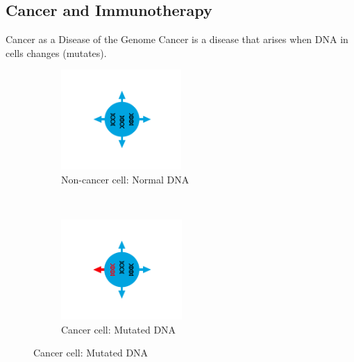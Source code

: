 \documentclass{beamer}
\begin{document}
\subsection{Cancer and Immunotherapy}
\begin{frame}{Cancer as a Disease of the Genome}
Cancer is a disease that arises when DNA in cells changes (mutates).
\begin{figure}[t!]
    \centering
    \begin{subfigure}[t]{0.45\textwidth}
        \centering
        \includegraphics[height=1.5in]{figures/IC1.png}
        \caption{Non-cancer cell: Normal DNA}
    \end{subfigure}
    ~ 
    \begin{subfigure}[t]{0.45\textwidth}
        \centering
        \includegraphics[height=1.5in]{figures/IC2.png}
        \caption{Cancer cell: Mutated DNA}
    \end{subfigure}
\end{figure}
\end{frame}
\end{document}
